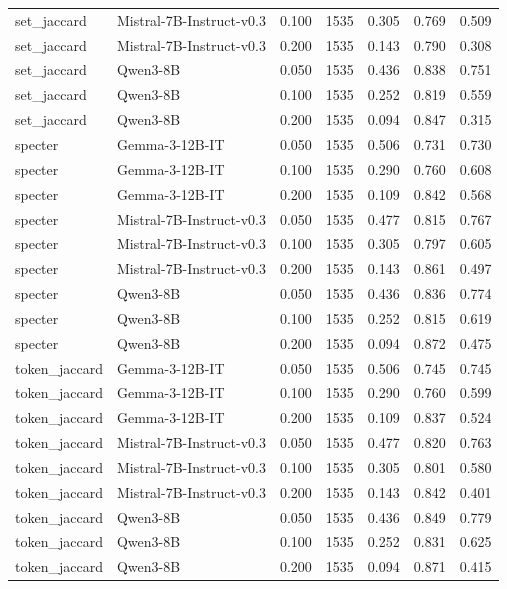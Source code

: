 \begin{tabular}{llrrrrr}
set\_jaccard & Mistral-7B-Instruct-v0.3 & 0.100 & 1535 & 0.305 & 0.769 & 0.509 \\
set\_jaccard & Mistral-7B-Instruct-v0.3 & 0.200 & 1535 & 0.143 & 0.790 & 0.308 \\
set\_jaccard & Qwen3-8B & 0.050 & 1535 & 0.436 & 0.838 & 0.751 \\
set\_jaccard & Qwen3-8B & 0.100 & 1535 & 0.252 & 0.819 & 0.559 \\
set\_jaccard & Qwen3-8B & 0.200 & 1535 & 0.094 & 0.847 & 0.315 \\
specter & Gemma-3-12B-IT & 0.050 & 1535 & 0.506 & 0.731 & 0.730 \\
specter & Gemma-3-12B-IT & 0.100 & 1535 & 0.290 & 0.760 & 0.608 \\
specter & Gemma-3-12B-IT & 0.200 & 1535 & 0.109 & 0.842 & 0.568 \\
specter & Mistral-7B-Instruct-v0.3 & 0.050 & 1535 & 0.477 & 0.815 & 0.767 \\
specter & Mistral-7B-Instruct-v0.3 & 0.100 & 1535 & 0.305 & 0.797 & 0.605 \\
specter & Mistral-7B-Instruct-v0.3 & 0.200 & 1535 & 0.143 & 0.861 & 0.497 \\
specter & Qwen3-8B & 0.050 & 1535 & 0.436 & 0.836 & 0.774 \\
specter & Qwen3-8B & 0.100 & 1535 & 0.252 & 0.815 & 0.619 \\
specter & Qwen3-8B & 0.200 & 1535 & 0.094 & 0.872 & 0.475 \\
token\_jaccard & Gemma-3-12B-IT & 0.050 & 1535 & 0.506 & 0.745 & 0.745 \\
token\_jaccard & Gemma-3-12B-IT & 0.100 & 1535 & 0.290 & 0.760 & 0.599 \\
token\_jaccard & Gemma-3-12B-IT & 0.200 & 1535 & 0.109 & 0.837 & 0.524 \\
token\_jaccard & Mistral-7B-Instruct-v0.3 & 0.050 & 1535 & 0.477 & 0.820 & 0.763 \\
token\_jaccard & Mistral-7B-Instruct-v0.3 & 0.100 & 1535 & 0.305 & 0.801 & 0.580 \\
token\_jaccard & Mistral-7B-Instruct-v0.3 & 0.200 & 1535 & 0.143 & 0.842 & 0.401 \\
token\_jaccard & Qwen3-8B & 0.050 & 1535 & 0.436 & 0.849 & 0.779 \\
token\_jaccard & Qwen3-8B & 0.100 & 1535 & 0.252 & 0.831 & 0.625 \\
token\_jaccard & Qwen3-8B & 0.200 & 1535 & 0.094 & 0.871 & 0.415 \\
\bottomrule
\end{tabular}
